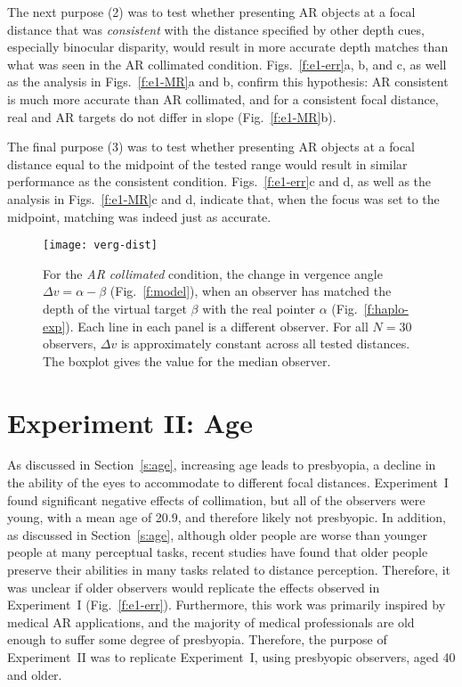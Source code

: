 \documentclass[10pt,journal,compsoc]{IEEEtran}
\newlength{\FigWidth}
\begin{document}
The next purpose (2) was to test whether presenting AR objects at a focal distance that was \emph{consistent} with the distance specified by other depth cues, especially binocular disparity, would result in more accurate depth matches than what was seen in the AR collimated condition.  Figs.~\ref{f:e1-err}a, b, and c, as well as the analysis in Figs.~\ref{f:e1-MR}a and b, confirm this hypothesis: AR consistent is much more accurate than AR collimated, and for a consistent focal distance, real and AR targets do not differ in slope (Fig.~\ref{f:e1-MR}b).  

The final purpose (3) was to test whether presenting AR objects at a focal distance equal to the midpoint of the tested range would result in similar performance as the consistent condition.  Figs.~\ref{f:e1-err}c and d, as well as the analysis in Figs.~\ref{f:e1-MR}c and d, indicate that, when the focus was set to the midpoint, 
matching was indeed just as accurate.

\begin{figure}[!t]
\centering
\texttt{[image: verg-dist]}
\caption{For the \emph{AR collimated} condition, the change in vergence angle $\Delta v = \alpha - \beta$ (Fig.~\ref{f:model}), when an observer has matched the depth of the virtual target $\beta$ with the real pointer $\alpha$ (Fig.~\ref{f:haplo-exp}).  Each line in each panel is a different observer.  For all $N = 30$ observers, $\Delta v$ is approximately constant across all tested distances.  The boxplot gives the value for the median observer.}
\label{f:vdist}
\end{figure}

\section {Experiment II: Age}
\label{s:exII}

As discussed in Section~\ref{s:age}, increasing age leads to presbyopia, a decline in the ability of the eyes to accommodate to different focal distances.  Experiment~I found significant negative effects of collimation, but all of the observers were young, with a mean age of 20.9, and therefore likely not presbyopic.  In addition, as discussed in Section~\ref{s:age}, although older people are worse than younger people at many perceptual tasks, recent studies have found that older people preserve their abilities in many tasks related to distance perception.  Therefore, it was unclear if older observers would replicate the effects observed in Experiment~I (Fig.~\ref{f:e1-err}).  Furthermore, this work was primarily inspired by medical AR applications, and the majority of medical professionals are old enough to suffer some degree of presbyopia.  Therefore, the purpose of Experiment~II was to replicate Experiment~I, using presbyopic observers, aged 40 and older. 
\end{document}

